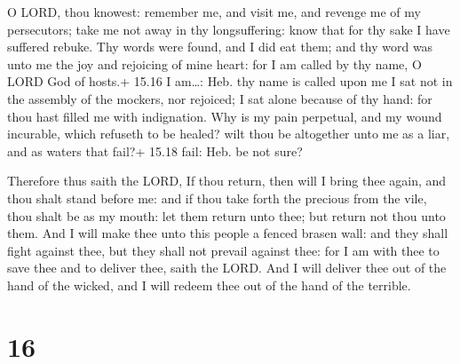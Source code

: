  O LORD, thou knowest: remember me, and visit me, and
revenge me of my persecutors; take me not away in thy longsuffering:
know that for thy sake I have suffered rebuke.  Thy words
were found, and I did eat them; and thy word was unto me the joy and
rejoicing of mine heart: for I am called by thy name, O LORD God of
hosts.+ 15.16 I am\ldots: Heb. thy name is called upon me 
I sat not in the assembly of the mockers, nor rejoiced; I sat alone
because of thy hand: for thou hast filled me with indignation.
 Why is my pain perpetual, and my wound incurable, which
refuseth to be healed? wilt thou be altogether unto me as a liar, and as
waters that fail?+ 15.18 fail: Heb. be not sure?

 Therefore thus saith the LORD, If thou return, then will
I bring thee again, and thou shalt stand before me: and if thou take
forth the precious from the vile, thou shalt be as my mouth: let them
return unto thee; but return not thou unto them.  And I
will make thee unto this people a fenced brasen wall: and they shall
fight against thee, but they shall not prevail against thee: for I am
with thee to save thee and to deliver thee, saith the LORD.
 And I will deliver thee out of the hand of the wicked, and
I will redeem thee out of the hand of the terrible.

\hypertarget{section-15}{%
\section{16}\label{section-15}}

